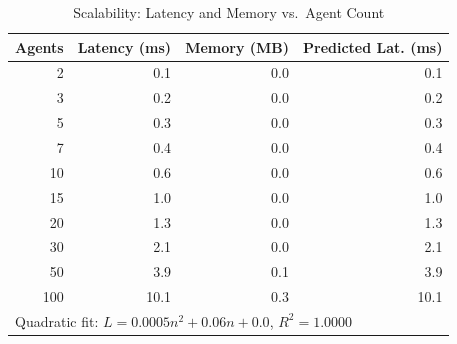 \begin{table}[htbp]
\centering
\caption{Scalability: Latency and Memory vs.\ Agent Count}
\label{tab:scalability}
\begin{tabular}{rrrr}
\toprule
Agents & Latency (ms) & Memory (MB) & Predicted Lat. (ms) \\
\midrule
  2 & 0.1 & 0.0 & 0.1 \\
  3 & 0.2 & 0.0 & 0.2 \\
  5 & 0.3 & 0.0 & 0.3 \\
  7 & 0.4 & 0.0 & 0.4 \\
 10 & 0.6 & 0.0 & 0.6 \\
 15 & 1.0 & 0.0 & 1.0 \\
 20 & 1.3 & 0.0 & 1.3 \\
 30 & 2.1 & 0.0 & 2.1 \\
 50 & 3.9 & 0.1 & 3.9 \\
100 & 10.1 & 0.3 & 10.1 \\
\midrule
\multicolumn{4}{l}{Quadratic fit: $L = 0.0005n^2 + 0.06n + 0.0$, $R^2 = 1.0000$} \\
\bottomrule
\end{tabular}
\end{table}